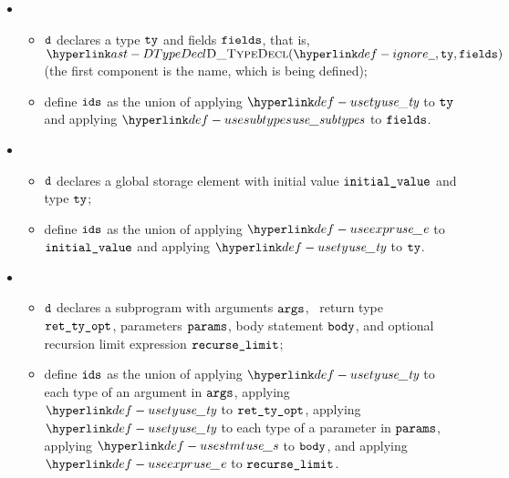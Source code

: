 \ProseParagraph
\OneApplies
\begin{itemize}
  \item {}
  \begin{itemize}
    \item $\texttt{d}$ declares a type $\texttt{ty}$ and fields $\texttt{fields}$, that is,
          $\DTypeDecl(\Ignore, \tty, \fields)$ (the first component is the name, which is being defined);
    \item define $\texttt{ids}$ as the union of applying $\usety$ to $\texttt{ty}$ and applying $\usesubtypes$ to $\texttt{fields}$.
  \end{itemize}

  \item {}
  \begin{itemize}
    \item $\texttt{d}$ declares a global storage element with initial value $\texttt{initial\_value}$ and type $\texttt{ty}$;
    \item define $\texttt{ids}$ as the union of applying $\useexpr$ to $\texttt{initial\_value}$ and applying $\usety$ to $\texttt{ty}$.
  \end{itemize}

  \item {}
  \begin{itemize}
    \item $\texttt{d}$ declares a subprogram with arguments $\texttt{args}$, \optional\ return type \\
          $\texttt{ret\_ty\_opt}$, parameters $\texttt{params}$, body statement $\texttt{body}$, and optional recursion limit expression $\texttt{recurse\_limit}$;
    \item define $\texttt{ids}$ as the union of applying $\usety$ to each type of an argument in $\texttt{args}$,
          applying $\usety$ to $\texttt{ret\_ty\_opt}$, applying $\usety$ to each type of a parameter in $\texttt{params}$,
          applying $\usestmt$ to $\texttt{body}$,
          and applying $\useexpr$ to $\texttt{recurse\_limit}$.
  \end{itemize}
\end{itemize}

